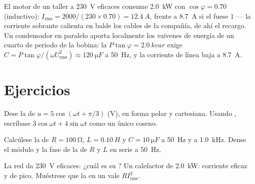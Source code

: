 \begin{example}\label{ex:b1:sinusoidal-impedance:pf}
El motor de un taller a \qty{230}{V} eficaces consume \qty{2.0}{kW} con
$\cos\varphi = 0.70$ (inductivo): $I_{\mathrm{rms}} = 2000/(230 \times
0.70) = \qty{12.4}{A}$, frente a \qty{8.7}{A} si el 
fuese $1$ --- la corriente sobrante calienta en balde los cables de la
compañía, de ahí el recargo. Un condensador en paralelo aporta localmente
los vaivenes de energía de un cuarto de periodo de la bobina: la
\emph{} $P\tan\varphi =
\qty{2.0}{kvar}$ exige $C = P\tan\varphi/(\omega U_{\mathrm{rms}}^2)
\approx \qty{120}{\micro F}$ a \qty{50}{Hz}, y la corriente de línea baja
a \qty{8.7}{A}.
\end{example}

\section{Ejercicios}

\begin{exercise}[$\star$]\label{exo:b1:sinusoidal-impedance:1}
Dese la  de $u = 5\cos(\omega t + \pi/3)$ (V), en forma
polar y cartesiana. Usando , escríbase $3\cos\omega t
+ 4\sin\omega t$ como un único coseno.
\end{exercise}

\begin{exercise}[$\star$]\label{exo:b1:sinusoidal-impedance:2}
Calcúlese la  de $R = \qty{100}{\ohm}$, $L = \qty{0.10}{H}$ y
$C = \qty{10}{\micro F}$ a \qty{50}{Hz} y a \qty{1.0}{kHz}. Dense el
módulo y la fase de la  de $R$ y $L$ en serie a
\qty{50}{Hz}.
\end{exercise}

\begin{exercise}[$\star$]\label{exo:b1:sinusoidal-impedance:3}
La red da \qty{230}{V} eficaces: ¿cuál es su ? Un calefactor de
\qty{2.0}{kW}: corriente eficaz y de pico. Muéstrese que la 
en un  vale $RI_{\mathrm{rms}}^2$.
\end{exercise}

